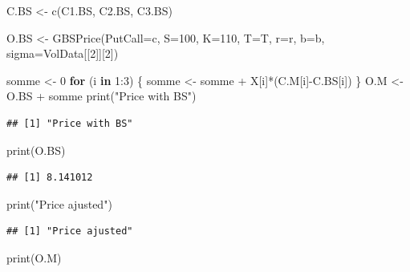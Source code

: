 \documentclass[
]{article}
\newenvironment{Shaded}{\begin{snugshade}}{\end{snugshade}}
\newcommand{\AttributeTok}[1]{\textcolor[rgb]{0.77,0.63,0.00}{#1}}
\newcommand{\ControlFlowTok}[1]{\textcolor[rgb]{0.13,0.29,0.53}{\textbf{#1}}}
\newcommand{\DecValTok}[1]{\textcolor[rgb]{0.00,0.00,0.81}{#1}}
\newcommand{\FunctionTok}[1]{\textcolor[rgb]{0.00,0.00,0.00}{#1}}
\newcommand{\NormalTok}[1]{#1}
\newcommand{\OtherTok}[1]{\textcolor[rgb]{0.56,0.35,0.01}{#1}}
\newcommand{\SpecialCharTok}[1]{\textcolor[rgb]{0.00,0.00,0.00}{#1}}
\newcommand{\StringTok}[1]{\textcolor[rgb]{0.31,0.60,0.02}{#1}}
\begin{document}
\begin{Shaded}
\begin{Highlighting}[]
\NormalTok{C.BS }\OtherTok{\textless{}{-}} \FunctionTok{c}\NormalTok{(C1.BS, C2.BS, C3.BS)}

\NormalTok{O.BS }\OtherTok{\textless{}{-}} \FunctionTok{GBSPrice}\NormalTok{(}\AttributeTok{PutCall=}\StringTok{\textquotesingle{}c\textquotesingle{}}\NormalTok{, }\AttributeTok{S=}\DecValTok{100}\NormalTok{, }\AttributeTok{K=}\DecValTok{110}\NormalTok{, }\AttributeTok{T=}\NormalTok{T, }\AttributeTok{r=}\NormalTok{r, }\AttributeTok{b=}\NormalTok{b, }\AttributeTok{sigma=}\NormalTok{VolData[[}\DecValTok{2}\NormalTok{]][}\DecValTok{2}\NormalTok{])}


\NormalTok{somme }\OtherTok{\textless{}{-}} \DecValTok{0}
\ControlFlowTok{for}\NormalTok{ (i }\ControlFlowTok{in} \DecValTok{1}\SpecialCharTok{:}\DecValTok{3}\NormalTok{) \{}
\NormalTok{  somme }\OtherTok{\textless{}{-}}\NormalTok{ somme }\SpecialCharTok{+}\NormalTok{ X[i]}\SpecialCharTok{*}\NormalTok{(C.M[i]}\SpecialCharTok{{-}}\NormalTok{C.BS[i])}
\NormalTok{\}}
\NormalTok{O.M }\OtherTok{\textless{}{-}}\NormalTok{ O.BS }\SpecialCharTok{+}\NormalTok{ somme}
\FunctionTok{print}\NormalTok{(}\StringTok{"Price with BS"}\NormalTok{)}
\end{Highlighting}
\end{Shaded}

\begin{verbatim}
## [1] "Price with BS"
\end{verbatim}

\begin{Shaded}
\begin{Highlighting}[]
\FunctionTok{print}\NormalTok{(O.BS)}
\end{Highlighting}
\end{Shaded}

\begin{verbatim}
## [1] 8.141012
\end{verbatim}

\begin{Shaded}
\begin{Highlighting}[]
\FunctionTok{print}\NormalTok{(}\StringTok{"Price ajusted"}\NormalTok{)}
\end{Highlighting}
\end{Shaded}

\begin{verbatim}
## [1] "Price ajusted"
\end{verbatim}

\begin{Shaded}
\begin{Highlighting}[]
\FunctionTok{print}\NormalTok{(O.M)}
\end{Highlighting}
\end{Shaded}
\end{document}
